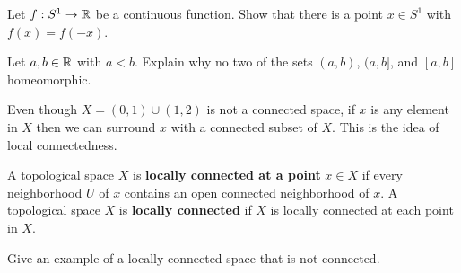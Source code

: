 \item Let $f: S^1 \to \mathbb{R}$ be a continuous function. Show that there is a point $x \in S^1$ with $f(x) = f(-x)$. 

\begin{comment}

\ExerciseSolution If $f = 0$, then any $x \in S^1$ will do. Suppose $f \neq 0$. Let $g:S^1 \to \R$ be defined by $g(x) = f(x) - f(-x)$. Since $-x$ is a scalar multiple of a continuous function and $g$ is a sum of continuous functions, $g$ is continuous. Let $a \in S_1$ such that $f(a) \neq 0$. If $f(a) = f(-a)$, we are done. So suppose $f(a) \neq f(-a)$. Without loss of generality, assume that $f(a) < f(-a)$. Then $g(a) = f(a) - f(-a) < 0$ and $g(-a) = f(-a) - f(a) > 0$. Since $S^1$ is connected, the Intermediate Value Theorem shows that there is a $y \in S^1$ with $g(y) = 0$. Thus, $f(y) = f(-y)$. 

\end{comment}

\item Let $a, b \in \mathbb{R}$ with $a < b$. Explain why no two of the sets $(a,b)$, $(a,b]$, and $[a,b]$ homeomorphic. 

\begin{comment}

\ExerciseSolution Notice that every point of $(0,1)$ is a cut point, while the point $b$ is not a cut point of $(a,b]$ or $[a,b]$. So $(a,b)$ is not homeomorphic to either $(a,b]$ or $[a,b]$. The set $(a,b]$ has only one point that is not a cut point while $[a,b]$ has two ($a$ and $b$). So $(a,b]$ is not homeomorphic to $[a,b]$. 

\end{comment}

\item Even though $X = (0,1) \cup (1,2)$ is not a connected space, if $x$ is any element in $X$ then we can surround $x$ with a connected subset of $X$.  This is the idea of local connectedness. 

\begin{definition} A topological space $X$ is \textbf{locally connected at a point} $x \in X$ if every neighborhood $U$ of $x$ contains an open connected neighborhood of $x$. A topological space $X$ is \textbf{locally connected} if $X$ is locally connected at each point in $X$. 
\end{definition}

\ba

\item Give an example of a locally connected space that is not connected. 

